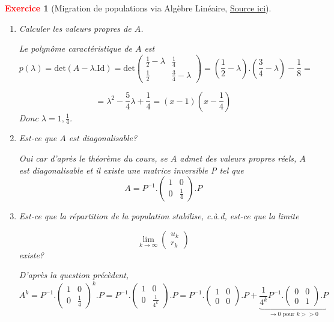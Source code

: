 \documentclass[11pt]{article}
\theoremstyle{mythmstyle}
\newtheorem{exo}{\textcolor{red}{\textbf{Exercice}}}
\begin{document}
\begin{exo}[Migration de populations via Algèbre Linéaire, \href{http://math.univ-lyon1.fr/homes-www/malbos/Ens/amalaa11.pdf}{Source ici}]
\begin{enumerate}
     \item Calculer les valeurs propres de $A$.
\begin{solution}
    Le polynôme caractéristique de $A$ est
    $$p(\lambda)=\mathrm{det}(A-\lambda.\mathrm{Id})=\mathrm{det}\begin{pmatrix}\frac{1}{2}-\lambda& \frac{1}{4}\\ \frac{1}{2}& \frac{3}{4}-\lambda\end{pmatrix}=(\frac{1}{2}-\lambda).(\frac{3}{4}-\lambda) - \frac{1}{8}=$$
    
    $$
    = \lambda^2 - \frac{5}{4}\lambda + \frac{1}{4}= (x-1)(x-\frac{1}{4})
    $$
    Donc $\lambda=1, \frac{1}{4}$.
\end{solution}


     \item Est-ce que $A$ est diagonalisable?
\begin{solution}
    Oui car d'après le théorème du cours, se $A$ admet des valeurs propres réels, $A$ est diagonalisable et il existe une matrice inversible P tel que
    $$
    A= P^{-1}.\begin{pmatrix}1& 0\\ 0& \frac{1}{4}\end{pmatrix}.P
    $$
\end{solution}

     \item Est-ce que la répartition de la population stabilise, c.à.d, est-ce que la limite
     
     $$
     \lim_{k\to\infty}\begin{pmatrix} u_{k}\\r_{k}\end{pmatrix}
     $$
     existe?
     
\begin{solution}
    D'après la question précèdent, 
    $$
    A^k= P^{-1}.\begin{pmatrix}1& 0\\ 0& \frac{1}{4}\end{pmatrix}^k.P= P^{-1}.\begin{pmatrix}1& 0\\ 0& \frac{1}{4^k}\end{pmatrix}.P= P^{-1}.\begin{pmatrix}1& 0\\ 0& 0\end{pmatrix}.P + \underbrace{\frac{1}{4^k}P^{-1}.\begin{pmatrix}0& 0\\ 0& 1\end{pmatrix}.P }_{\to 0 \text{ pour } k>>0 }
    $$
    

\end{solution}
\end{enumerate}
\end{exo}
\end{document}
